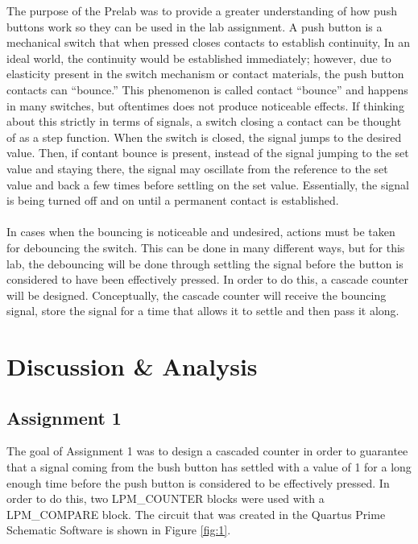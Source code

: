 \documentclass[
	letterpaper, %
	10pt, %
]{CSUniSchoolLabReport}
\begin{document}
\hspace{.5 in} The purpose of the Prelab was to provide a greater understanding of how push buttons work so they can be used in the lab assignment. A push button is a mechanical switch that when pressed closes contacts to establish continuity, In an ideal world, the continuity would be established immediately; however, due to elasticity present in the switch mechanism or contact materials, the push button contacts can ``bounce.'' This phenomenon is called contact ``bounce'' and happens in many switches, but oftentimes does not produce noticeable effects. If thinking about this strictly in terms of signals, a switch closing a contact can be thought of as a step function. When the switch is closed, the signal jumps to the desired value. Then, if contant bounce is present, instead of the signal jumping to the set value and staying there, the signal may oscillate from the reference to the set value and back a few times before settling on the set value. Essentially, the signal is being turned off and on until a permanent contact is established. \\\\
In cases when the bouncing is noticeable and undesired, actions must be taken for debouncing the switch. This can be done in many different ways, but for this lab, the debouncing will be done through settling the signal before the button is considered to have been effectively pressed. In order to do this, a cascade counter will be designed. Conceptually, the cascade counter will receive the bouncing signal, store the signal for a time that allows it to settle and then pass it along. 

\section{Discussion \& Analysis} 

\subsection{Assignment 1}

The goal of Assignment 1 was to design a cascaded counter in order to guarantee that a signal coming from the bush button has settled with a value of 1 for a long enough time before the push button is considered to be effectively pressed. In order to do this, two \textsc{LPM\_COUNTER} blocks were used with a \textsc{LPM\_COMPARE} block. The circuit that was created in the Quartus Prime Schematic Software is shown in Figure \ref{fig:1}.
\end{document}
